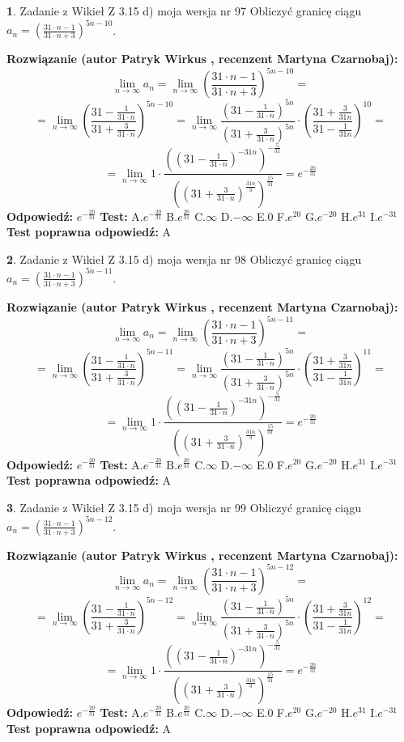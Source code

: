 \documentclass[12pt, a4paper]{article}
\theoremstyle{definition} %
\newtheorem{zad}{}
\newcommand{\zadStart}[1]{\begin{zad}#1\newline}
\newcommand{\zadStop}{\end{zad}}
\newcommand{\rozwStart}[2]{\noindent \textbf{Rozwiązanie (autor #1 , recenzent #2): }\newline}
\newcommand{\rozwStop}{\newline}
\newcommand{\odpStart}{\noindent \textbf{Odpowiedź:}\newline}
\newcommand{\odpStop}{\newline}
\newcommand{\testStart}{\noindent \textbf{Test:}\newline}
\newcommand{\testStop}{\newline}
\newcommand{\kluczStart}{\noindent \textbf{Test poprawna odpowiedź:}\newline}
\newcommand{\kluczStop}{\newline}
\begin{document}
\zadStart{Zadanie z Wikieł Z 3.15 d) moja wersja nr 97}
Obliczyć granicę ciągu $a_{n}=(\frac{31\cdot n - 1}{31 \cdot n + 3})^{5n-10}$.
\zadStop
\rozwStart{Patryk Wirkus}{Martyna Czarnobaj}
$$\lim\limits_{n\to\infty} a_{n} = \lim\limits_{n\to\infty}(\frac{31\cdot n - 1}{31 \cdot n + 3})^{5n-10}=$$
$$=\lim\limits_{n\to\infty}(\frac{31 - \frac{1}{31\cdot n}}{31 + \frac{3}{31 \cdot n}})^{5n-10}=\lim\limits_{n\to\infty}\frac{(31 - \frac{1}{31\cdot n})^{5n}}{(31 + \frac{3}{31\cdot n})^{5n}} \cdot (\frac{31+\frac{3}{31n}}{31-\frac{1}{31n}})^{10}=$$
$$=\lim\limits_{n\to\infty} 1 \cdot \frac{((31-\frac{1}{31 \cdot n})^{-31n})^{-\frac{5}{31}}}{((31+\frac{3}{31 \cdot n})^{\frac{31n}{3}})^{\frac{15}{31}}} =e^{-\frac{20}{31}}$$
\rozwStop
\odpStart
$e^{-\frac{20}{31}}$
\odpStop
\testStart
A.$ e^{-\frac{20}{31}}$
B.$ e^{\frac{20}{31}}$
C.$\infty$
D.$-\infty$
E.$0$
F.$e^{20}$
G.$e^{-20}$
H.$e^{31}$
I.$e^{-31}$
\testStop
\kluczStart
A
\kluczStop



\zadStart{Zadanie z Wikieł Z 3.15 d) moja wersja nr 98}
Obliczyć granicę ciągu $a_{n}=(\frac{31\cdot n - 1}{31 \cdot n + 3})^{5n-11}$.
\zadStop
\rozwStart{Patryk Wirkus}{Martyna Czarnobaj}
$$\lim\limits_{n\to\infty} a_{n} = \lim\limits_{n\to\infty}(\frac{31\cdot n - 1}{31 \cdot n + 3})^{5n-11}=$$
$$=\lim\limits_{n\to\infty}(\frac{31 - \frac{1}{31\cdot n}}{31 + \frac{3}{31 \cdot n}})^{5n-11}=\lim\limits_{n\to\infty}\frac{(31 - \frac{1}{31\cdot n})^{5n}}{(31 + \frac{3}{31\cdot n})^{5n}} \cdot (\frac{31+\frac{3}{31n}}{31-\frac{1}{31n}})^{11}=$$
$$=\lim\limits_{n\to\infty} 1 \cdot \frac{((31-\frac{1}{31 \cdot n})^{-31n})^{-\frac{5}{31}}}{((31+\frac{3}{31 \cdot n})^{\frac{31n}{3}})^{\frac{15}{31}}} =e^{-\frac{20}{31}}$$
\rozwStop
\odpStart
$e^{-\frac{20}{31}}$
\odpStop
\testStart
A.$ e^{-\frac{20}{31}}$
B.$ e^{\frac{20}{31}}$
C.$\infty$
D.$-\infty$
E.$0$
F.$e^{20}$
G.$e^{-20}$
H.$e^{31}$
I.$e^{-31}$
\testStop
\kluczStart
A
\kluczStop



\zadStart{Zadanie z Wikieł Z 3.15 d) moja wersja nr 99}
Obliczyć granicę ciągu $a_{n}=(\frac{31\cdot n - 1}{31 \cdot n + 3})^{5n-12}$.
\zadStop
\rozwStart{Patryk Wirkus}{Martyna Czarnobaj}
$$\lim\limits_{n\to\infty} a_{n} = \lim\limits_{n\to\infty}(\frac{31\cdot n - 1}{31 \cdot n + 3})^{5n-12}=$$
$$=\lim\limits_{n\to\infty}(\frac{31 - \frac{1}{31\cdot n}}{31 + \frac{3}{31 \cdot n}})^{5n-12}=\lim\limits_{n\to\infty}\frac{(31 - \frac{1}{31\cdot n})^{5n}}{(31 + \frac{3}{31\cdot n})^{5n}} \cdot (\frac{31+\frac{3}{31n}}{31-\frac{1}{31n}})^{12}=$$
$$=\lim\limits_{n\to\infty} 1 \cdot \frac{((31-\frac{1}{31 \cdot n})^{-31n})^{-\frac{5}{31}}}{((31+\frac{3}{31 \cdot n})^{\frac{31n}{3}})^{\frac{15}{31}}} =e^{-\frac{20}{31}}$$
\rozwStop
\odpStart
$e^{-\frac{20}{31}}$
\odpStop
\testStart
A.$ e^{-\frac{20}{31}}$
B.$ e^{\frac{20}{31}}$
C.$\infty$
D.$-\infty$
E.$0$
F.$e^{20}$
G.$e^{-20}$
H.$e^{31}$
I.$e^{-31}$
\testStop
\kluczStart
A
\kluczStop
\end{document}
